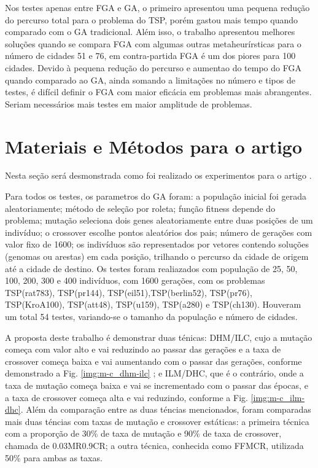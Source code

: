 \documentclass[conference]{IEEEtran}
\begin{document}
Nos testes apenas entre FGA e GA, o primeiro apresentou uma pequena redução do percurso total para o problema do TSP, porém gastou mais tempo quando comparado com o GA tradicional. Além isso, o trabalho apresentou melhores soluções quando se compara FGA com algumas outras metaheurírsticas para o número de cidades 51 e 76, em contra-partida FGA é um dos piores para 100 cidades. Devido à pequena redução do percurso e aumentao do tempo do FGA quando comparado ao GA, ainda somando a limitações no número e tipos de testes, é difícil definir o FGA com maior eficácia em problemas mais abrangentes. Seriam necessários mais testes em maior amplitude de problemas.

\section{Materiais e Métodos para o artigo \cite{m-c}}
\label{sec:materials}
Nesta seção será desmonstrada como foi realizado os experimentos para o artigo \cite{m-c}.

Para todos os testes, os parametros do GA foram: a população inicial foi gerada aleatoriamente; método de seleção por roleta; função fitness depende do problema; mutação seleciona dois genes aleatoriamente entre duas posições de um indivíduo; o crossover escolhe pontos aleatórios dos pais; número de gerações com valor fixo de 1600; os indivíduos são representados por vetores contendo soluções (genomas ou arestas) em cada posição, trilhando o percurso da cidade de origem até a cidade de destino. 
Os testes foram realiazados com população de 25, 50, 100, 200, 300 e 400 indivíduos, com 1600 gerações, com os problemas TSP(rat783), TSP(pr144), TSP(eil51),TSP(berlin52), TSP(pr76), TSP(KroA100), TSP(att48), TSP(u159), TSP(a280) e TSP(ch130). Houveram um total 54 testes, variando-se o tamanho da população e número de cidades. 

A proposta deste trabalho é demonstrar duas ténicas: DHM/ILC, cujo a mutação começa com valor alto e vai reduzindo ao passar das gerações e a taxa de crossover começa baixa e vai aumentando com o passar das gerações,  conforme demonstrado a Fig. \ref{img:m-c_dhm-ilc} ; e ILM/DHC, que é o contrário, onde a taxa de mutação começa baixa e vai se incrementado com o passar das épocas, e a taxa de crossover começa alta e vai reduzindo, conforme a Fig. \ref{img:m-c_ilm-dhc}. Além da comparação entre as duas téncias mencionados, foram comparadas mais duas téncias com taxas de mutação e crossover estáticas: a primeira técnica com a proporção de 30\% de taxa de mutação e 90\% de taxa de crossover, chamada de  0.03MR0.9CR; a outra técnica, conhecida como FFMCR, utilizada  50\% para ambas as taxas.
\end{document}
